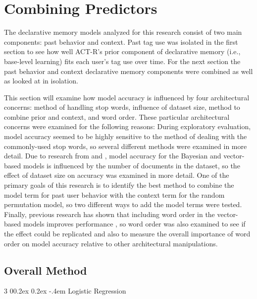 \documentclass[man,floatsintext,donotrepeattitle]{apa6}
\makeatletter
\renewcommand{\subsubsection}{%
  \@startsection
  {subsubsection}%
  {3}%
  {\parindent}%
  {0\baselineskip \@plus 0.2ex \@minus 0.2ex}%
  {-.4em}%
  {\normalfont\normalsize\bfseries\addperi}}
\makeatother
\begin{document}
\section{Combining Predictors}

The declarative memory models analyzed for this research consist of two main components: past behavior and context.
Past tag use was isolated in the first section to see how well ACT-R's prior component of declarative memory (i.e., base-level learning) fits each user's tag use over time.
For the next section the past behavior and context declarative memory components were combined as well as looked at in isolation.

This section will examine how model accuracy is influenced by four architectural concerns:
method of handling stop words, influence of dataset size, method to combine prior and context, and word order.
These particular architectural concerns were examined for the following reasons:
During exploratory evaluation, model accuracy seemed to be highly sensitive to the method of dealing with the commonly-used stop words, so several different methods were examined in more detail.
Due to research from \textcite{Budiu2007} and \textcite{Recchia2010}, model accuracy for the Bayesian and vector-based models is influenced by the number of documents in the dataset,
so the effect of dataset size on accuracy was examined in more detail.
One of the primary goals of this research is to identify the best method to combine the model term for past user behavior with the context term for the random permutation model,
so two different ways to add the model terms were tested.
Finally, previous research has shown that including word order in the vector-based models improves performance \parencites{Jones2007, Sahlgren2008},
so word order was also examined to see if the effect could be replicated and also to measure the overall importance of word order on model accuracy relative to other architectural manipulations.

\subsection{Overall Method}

\subsubsection{Logistic Regression}
\end{document}
